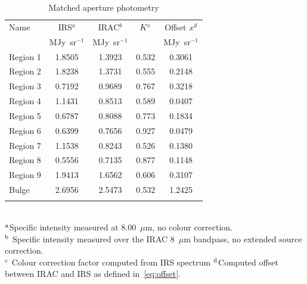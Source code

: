 \begin{table}
 \centering
 \begin{minipage}{90mm}
\caption{Matched aperture photometry}
  \begin{tabular}{lcccc}
  \hline{Name}&{IRS$^{a}$}&{IRAC$^{b}$}&{$K^{\rm c}$}&{Offset $x^d$} \\ 
{} & { MJy~sr$^{-1}$} & { MJy~sr$^{-1}$} & &  MJy~sr$^{-1}$
   \\
 \hline
 Region 1 & 1.8505 & 1.3923 & 0.532 & 0.3061
 \\ Region 2  & 1.8238 & 1.3731 & 0.555 & 0.2148
 \\ Region 3 & 0.7192 & 0.9689 & 0.767 & 0.3218
 \\ Region 4 & 1.1431 & 0.8513 & 0.589 & 0.0407
 \\  Region 5 & 0.6787 & 0.8088 & 0.773 & 0.1834
 \\  Region 6  & 0.6399 & 0.7656 & 0.927 & 0.0479
 \\  Region 7  & 1.1538 & 0.8243 & 0.526 & 0.1380
 \\ Region 8 & 0.5556 & 0.7135 & 0.877 & 0.1148
 \\  Region 9 & 1.9413 & 1.6562 & 0.606 & 0.3107 
 \\ Bulge & 2.6956 & 2.5473 & 0.532 & 1.2425\\
\hline
 \label{colourK}
\end{tabular}\\
 {$^{\rm a}$Specific intensity measured at 8.00~$\mu$m, no colour correction.\\
 $^{\rm b}$ Specific intensity measured over the IRAC 8~$\mu$m bandpass, no extended source correction.\\
$^{\rm c}$ Colour correction factor computed from IRS spectrum
 $^{\rm d}$Computed offset between IRAC and IRS as defined in~\ref{eq:offset}. }
\end{minipage}
\end{table}

